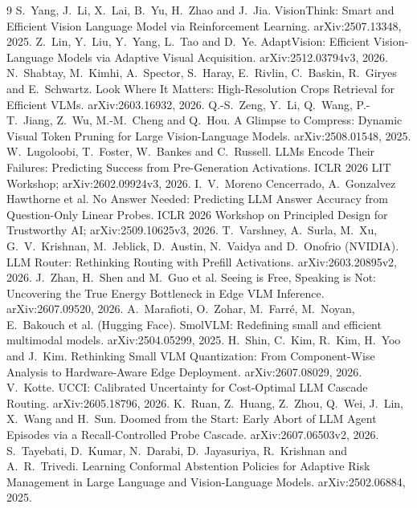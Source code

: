 \documentclass[10pt,twocolumn]{article}
\theoremstyle{plain}
\begin{document}
\begin{thebibliography}{9}\small
{} S.~Yang, J.~Li, X.~Lai, B.~Yu, H.~Zhao and J.~Jia. VisionThink: Smart and Efficient Vision Language Model via Reinforcement Learning. arXiv:2507.13348, 2025.
 Z.~Lin, Y.~Liu, Y.~Yang, L.~Tao and D.~Ye. AdaptVision: Efficient Vision-Language Models via Adaptive Visual Acquisition. arXiv:2512.03794v3, 2026.
 N.~Shabtay, M.~Kimhi, A.~Spector, S.~Haray, E.~Rivlin, C.~Baskin, R.~Giryes and E.~Schwartz. Look Where It Matters: High-Resolution Crops Retrieval for Efficient VLMs. arXiv:2603.16932, 2026.
 Q.-S.~Zeng, Y.~Li, Q.~Wang, P.-T.~Jiang, Z.~Wu, M.-M.~Cheng and Q.~Hou. A Glimpse to Compress: Dynamic Visual Token Pruning for Large Vision-Language Models. arXiv:2508.01548, 2025.
 W.~Lugoloobi, T.~Foster, W.~Bankes and C.~Russell. LLMs Encode Their Failures: Predicting Success from Pre-Generation Activations. ICLR 2026 LIT Workshop; arXiv:2602.09924v3, 2026.
 I.~V.~Moreno Cencerrado, A.~Gonzalvez Hawthorne et al. No Answer Needed: Predicting LLM Answer Accuracy from Question-Only Linear Probes. ICLR 2026 Workshop on Principled Design for Trustworthy AI; arXiv:2509.10625v3, 2026.
 T.~Varshney, A.~Surla, M.~Xu, G.~V.~Krishnan, M.~Jeblick, D.~Austin, N.~Vaidya and D.~Onofrio (NVIDIA). LLM Router: Rethinking Routing with Prefill Activations. arXiv:2603.20895v2, 2026.
 J.~Zhan, H.~Shen and M.~Guo et al. Seeing is Free, Speaking is Not: Uncovering the True Energy Bottleneck in Edge VLM Inference. arXiv:2607.09520, 2026.
 A.~Marafioti, O.~Zohar, M.~Farr\'e, M.~Noyan, E.~Bakouch et al. (Hugging Face). SmolVLM: Redefining small and efficient multimodal models. arXiv:2504.05299, 2025.
 H.~Shin, C.~Kim, R.~Kim, H.~Yoo and J.~Kim. Rethinking Small VLM Quantization: From Component-Wise Analysis to Hardware-Aware Edge Deployment. arXiv:2607.08029, 2026.
 V.~Kotte. UCCI: Calibrated Uncertainty for Cost-Optimal LLM Cascade Routing. arXiv:2605.18796, 2026.
 K.~Ruan, Z.~Huang, Z.~Zhou, Q.~Wei, J.~Lin, X.~Wang and H.~Sun. Doomed from the Start: Early Abort of LLM Agent Episodes via a Recall-Controlled Probe Cascade. arXiv:2607.06503v2, 2026.
 S.~Tayebati, D.~Kumar, N.~Darabi, D.~Jayasuriya, R.~Krishnan and A.~R.~Trivedi. Learning Conformal Abstention Policies for Adaptive Risk Management in Large Language and Vision-Language Models. arXiv:2502.06884, 2025.

\end{thebibliography}
\end{document}
